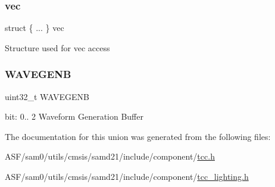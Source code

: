 \subsubsection{\texorpdfstring{vec}{vec}\hspace{0.1cm}{\footnotesize\ttfamily [2/2]}}
{\footnotesize\ttfamily struct \{ ... \}   vec}

Structure used for vec access \mbox{\label{union_t_c_c___w_a_v_e_b___type_a70896df5930f1a00b3e091224b79334f}} 
\subsubsection{\texorpdfstring{WAVEGENB}{WAVEGENB}}
{\footnotesize\ttfamily uint32\+\_\+t W\+A\+V\+E\+G\+E\+NB}

bit\+: 0.. 2 Waveform Generation Buffer 

The documentation for this union was generated from the following files\+:\begin{DoxyCompactItemize}
\item 
A\+S\+F/sam0/utils/cmsis/samd21/include/component/\mbox{\hyperlink{tcc_8h}{tcc.\+h}}\item 
A\+S\+F/sam0/utils/cmsis/samd21/include/component/\mbox{\hyperlink{tcc__lighting_8h}{tcc\+\_\+lighting.\+h}}\end{DoxyCompactItemize}
